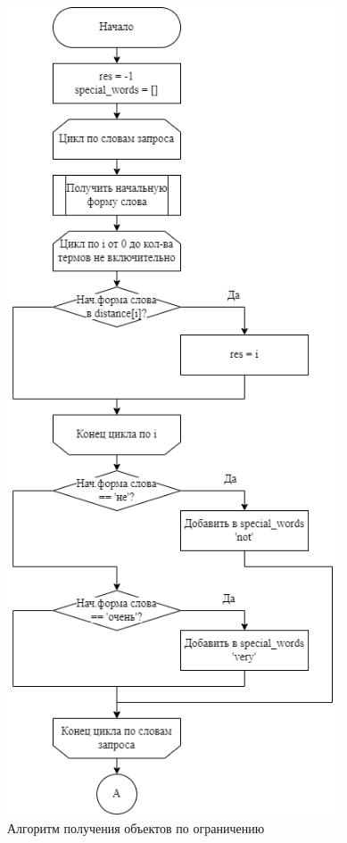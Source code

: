 \begin{figure}[h!btp]
	\centering
	\includegraphics[width=280pt]{inc/get_planets_1.png}
	\caption{Алгоритм получения объектов по ограничению}
	\label{fig:get1}	
\end{figure}

\clearpage


